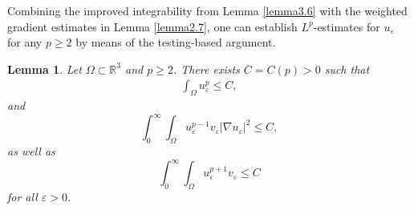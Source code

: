 \documentclass[12pt]{article}
\theoremstyle{plain}
\newtheorem{lemma}{Lemma}[section]
\theoremstyle{definition}
\numberwithin{equation}{section}
\begin{document}
Combining the improved integrability from Lemma \ref{lemma3.6} with the weighted gradient estimates in Lemma \ref{lemma2.7}, one can  establish $L^p$-estimates for $u_\varepsilon$ for any $p\geq2$ by means of the testing-based argument.
\begin{lemma}\label{lemma3.7}
Let $\Omega\subset\mathbb{R}^3$ and $p\geq2$. There exists $C=C(p)>0$ such that
    \begin{equation}\label{3.19}
        \begin{split}
          \int_\Omega u_\varepsilon^p\leq C,%
        \end{split}
    \end{equation}
    and
    \begin{equation}\label{3.20}
    \int_0^\infty\int_\Omega u_{\varepsilon}^{p-1}v_{\varepsilon}|\nabla u_{\varepsilon}|^2\leq C,%
    \end{equation}
    as well as
    \begin{equation}\label{3.21}
    \int_0^{\infty}\int_\Omega u_\varepsilon^{p+1}v_\varepsilon\leq C
    \end{equation} for all $\varepsilon>0$.
\end{lemma}
\end{document}
